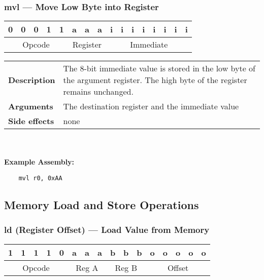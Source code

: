 \documentclass[titlepage]{article}
\begin{document}
\subsubsection{mvl --- Move Low Byte into Register}\begin{center}
\begin{tabular}{|c|c|c|c|c|c|c|c|c|c|c|c|c|c|c|c|}
\hline
0 & 0 & 0 & 1 & 1 & a & a & a & i & i & i & i & i & i & i & i \\
\hline
\multicolumn{5}{|c}{Opcode} &
\multicolumn{3}{|c}{Register} &
\multicolumn{8}{|c|}{Immediate} \\
\hline
\end{tabular}
\end{center}

\begin{tabular}{l p{8cm}}
{\bf Description} & The 8-bit immediate value is stored in the low byte of the argument register. The high byte of the register remains unchanged. \\
{\bf Arguments} & The destination register and the immediate value \\
{\bf Side effects} & none \\
\end{tabular}\\ \\
{\bf Example Assembly:}
\begin{verbatim}
    mvl r0, 0xAA
\end{verbatim}

\subsection{Memory Load and Store Operations}

\subsubsection{ld (Register Offset) --- Load Value from Memory}\begin{center}
\begin{tabular}{|c|c|c|c|c|c|c|c|c|c|c|c|c|c|c|c|}
\hline
1 & 1 & 1 & 1 & 0 & a & a & a & b & b & b & o & o & o & o & o \\
\hline
\multicolumn{5}{|c}{Opcode} &
\multicolumn{3}{|c}{Reg A} &
\multicolumn{3}{|c}{Reg B} &
\multicolumn{5}{|c|}{Offset} \\
\hline
\end{tabular}
\end{center}
\end{document}
